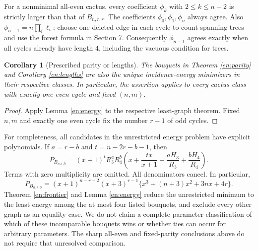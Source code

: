 \documentclass[12pt]{amsart}
\newtheorem{cor}[thm]{Corollary}
\theoremstyle{definition}
\theoremstyle{remark}
\numberwithin{equation}{section}
\begin{document}
For a nonminimal all-even cactus, every coefficient $\phi_k$ with
$2\le k\le n-2$ is strictly larger than that of $B_{n,r,r}$.
The coefficients $\phi_0,\phi_1,\phi_n$ always agree.
Also $\phi_{n-1}=n\prod_i\ell_i$: choose one deleted edge in each
cycle to count spanning trees and use the forest formula in Section 7.
Consequently $\phi_{n-1}$ agrees exactly when all cycles already have
length $4$, including the vacuous condition for trees.

\begin{cor}[Prescribed parity or lengths]\label{en:fixedenergy}
The bouquets in Theorem \ref{en:parity} and Corollary \ref{en:lengths}
are also the unique incidence-energy minimizers in their respective
classes. In particular, the assertion applies to every cactus class with
exactly one even cycle and fixed $(n,m)$.
\end{cor}
\begin{proof}
Apply Lemma \ref{en:energy} to the respective least-graph theorem.
Fixed $n,m$ and exactly one even cycle fix the number $r-1$ of odd cycles.
\end{proof}

For completeness, all candidates in the unrestricted energy problem have
explicit polynomials. If $a=r-b$ and $t=n-2r-b-1$, then
\begin{equation}\label{en:generalP}
 P_{B_{n,r,b}}=
 (x+1)^tR_3^aR_4^b
 \left(x+\frac{tx}{x+1}+\frac{aH_3}{R_3}
                         +\frac{bH_4}{R_4}\right).
\end{equation}
Terms with zero multiplicity are omitted. All denominators cancel.
In particular,
\[
 P_{B_{n,r,0}}=(x+1)^{n-r-2}(x+3)^{r-1}
             \{x^3+(n+3)x^2+3nx+4r\}.
\]
Theorem \ref{en:frontier} and Lemma \ref{en:energy} reduce the unrestricted
minimum to the least energy among the at most four listed bouquets, and
exclude every other graph as an equality case. We do not claim a complete
parameter classification of which of these incomparable bouquets wins or
whether ties can occur for arbitrary parameters. The sharp all-even and
fixed-parity conclusions above do not require that unresolved comparison.
\end{document}
